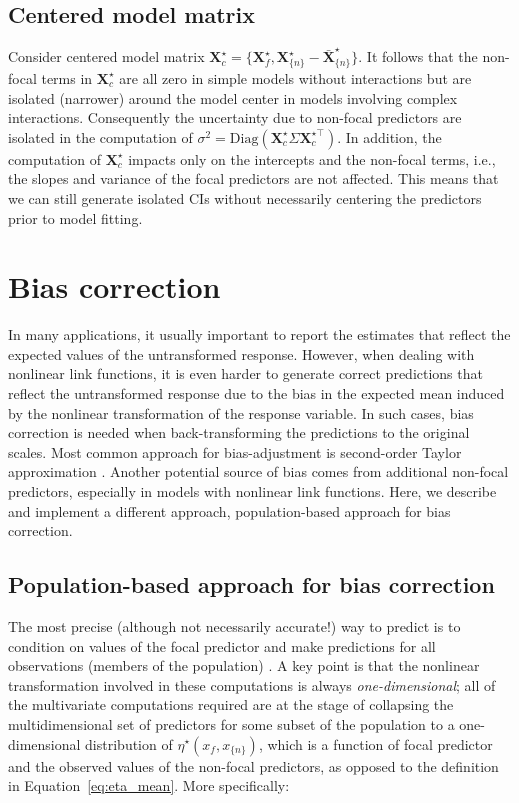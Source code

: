 \documentclass[10pt,letterpaper]{article}
\newcommand{\bX}{{\mathbf X}}
\newcommand{\nset}[1]{#1_{\{n\}}}
\begin{document}
\subsection*{Centered model matrix}

Consider centered model matrix $\bX^{\star}_{c} = \{\bX_f^\star, \nset{{\bX}^\star} - \nset{{\bar{\bX}}^\star}\}$. It follows that the non-focal terms in $\bX^{\star}_{c}$ are all zero in simple models without interactions but are isolated (narrower) around the model center in models involving complex interactions. Consequently the uncertainty due to non-focal predictors are isolated in the computation of $\sigma^2 = \textrm{Diag}(\bX^\star_c \Sigma \bX^{\star\top}_c)$. In addition, the computation of $\bX^{\star}_c$ impacts only on the intercepts and the non-focal terms, i.e., the slopes and variance of the focal predictors are not affected. This means that we can still generate isolated CIs without necessarily centering the predictors prior to model fitting.


\section*{Bias correction}

In many applications, it usually important to report the estimates that reflect the expected values of the untransformed response. However, when dealing with nonlinear link functions, it is even harder to generate correct predictions that reflect the untransformed response due to the bias in the expected mean induced by the nonlinear transformation of the response variable. In such cases, bias correction is needed when back-transforming the predictions to the original scales. Most common approach for bias-adjustment is second-order Taylor approximation \cite{lenth2018package, duursma2003bias}. Another potential source of bias comes from additional non-focal predictors, especially in models with nonlinear link functions. Here, we describe and implement a different approach, population-based approach for bias correction.


\subsection*{Population-based approach for bias correction}

The most precise (although not necessarily accurate!) way to predict is to condition on values of the focal predictor and make predictions for all observations (members of the population) \cite{hanmer2013behind}. A key point is that the nonlinear transformation involved in these computations is always \emph{one-dimensional}; all of the multivariate computations required are at the stage of collapsing the multidimensional set of predictors for some subset of the population to a one-dimensional distribution of $\eta^\star(x_f, \nset{x})$, which is a function of focal predictor and the observed values of the non-focal predictors, as opposed to the definition in Equation~\ref{eq:eta_mean}. More specifically:
\end{document}
